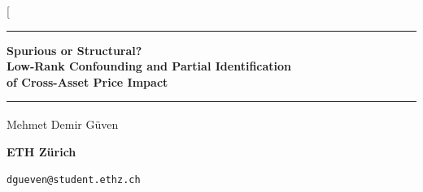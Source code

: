 \documentclass[10pt,twocolumn]{article}
\theoremstyle{remark}
\begin{document}
\twocolumn[
\begin{@twocolumnfalse}
\begin{center}
\rule{\textwidth}{1.1pt}\vspace{5pt}

{\LARGE\bfseries Spurious or Structural?\\[4pt]
Low-Rank Confounding and Partial Identification\\
of Cross-Asset Price Impact\par}

\vspace{7pt}
\rule{\textwidth}{0.5pt}

\vspace{9pt}
{\large Mehmet Demir G\"uven\textsuperscript{\dag}\par}
\vspace{4pt}
{\normalsize\bfseries ETH Z\"urich\par}
\vspace{3pt}
{\small \texttt{dgueven@student.ethz.ch}\par}
\end{center}


\end{@twocolumnfalse}
\end{document}
